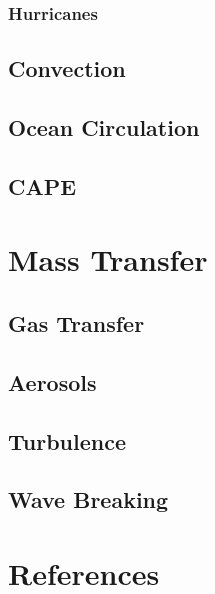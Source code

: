 \documentclass{report}
\begin{document}
\subsection{Hurricanes}
\label{hurricanes}

    \section{Convection}
\label{convection}
    \lipsum[1-2]

    \section{Ocean Circulation}
\label{circulation}
    \lipsum[1-2]

    \section{CAPE}
\label{cape}
    \lipsum[1-2]

\chapter{Mass Transfer}
\label{masstransfer}
    \lipsum[10]
  
    \section{Gas Transfer}
\label{gastransfer}
    \lipsum[1-2]
   
    \section{Aerosols}
\label{aerosols}
    \lipsum[1-2]

    \section{Turbulence}
\label{massturbulence}
    \lipsum[1-2]
  
    \section{Wave Breaking}
\label{masswavebreaking}
    \lipsum[1-2]

\chapter{References}


  
\end{document}
